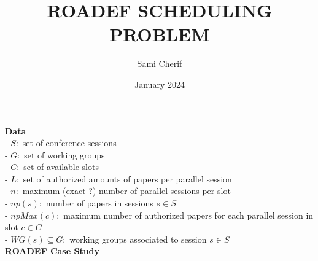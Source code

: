 \documentclass{article}
\title{ROADEF SCHEDULING PROBLEM}
\author{Sami Cherif}
\date{January 2024}
\begin{document}
\maketitle

\textbf{Data}\\

- $S :$ set of conference sessions \\
- $G :$ set of working groups \\
- $C :$ set of available slots\\
- $L :$ set of authorized amounts of papers per parallel session\\

- $n :$ maximum (exact ?) number of parallel sessions per slot\\
- $np(s) :$ number of papers in sessions $s\in S$\\
- $npMax(c):$ maximum number of authorized papers for each parallel session in slot $c\in C$\\

- $WG(s)\subseteq G :$ working groups associated to session $s\in S$\\

\textbf{ROADEF Case Study}\\
\end{document}
